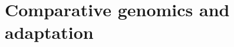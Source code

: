 

\part{Comparative genomics and adaptation}
\label{part1}

\tableofcontents

\clearpage


\clearpage


